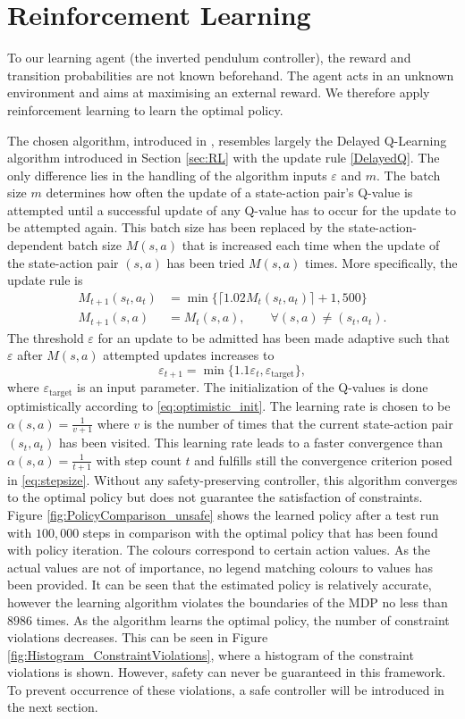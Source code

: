 \documentclass[../main.tex]{subfiles}
\begin{document}
\section{Reinforcement Learning}
To our learning agent (the inverted pendulum controller), the reward and transition probabilities are not known beforehand. The agent acts in an unknown environment and aims at maximising an external reward. We therefore apply reinforcement learning to learn the optimal policy. 

The chosen algorithm, introduced in \cite{talebi2017modified}, resembles largely the Delayed Q-Learning algorithm introduced in Section \ref{sec:RL} with the update rule \eqref{DelayedQ}. The only difference lies in the handling of the algorithm inputs $\varepsilon$ and $m$. The batch size $m$ determines how often the update of a state-action pair's Q-value is attempted until a successful update of any Q-value has to occur for the update to be attempted again. This batch size has been replaced by the state-action-dependent batch size $M(s,a)$ that is increased each time when the update of the state-action pair $(s,a)$ has been tried $M(s,a)$ times. More specifically, the update rule is 
\begin{align}
    M_{t+1}(s_t,a_t) &= \min\{\lceil1.02M_t(s_t,a_t)\rceil+1, 500\}\\
    M_{t+1}(s,a) &= M_t(s,a), \qquad \forall (s,a) \neq (s_t,a_t).
\end{align}
The threshold $\varepsilon$ for an update to be admitted has been made adaptive such that $\varepsilon$ after $M(s,a)$ attempted updates increases to 
\begin{equation}
    \varepsilon_{t+1} = \min\{1.1 \varepsilon_t, \varepsilon_{\text{target}}\}, 
\end{equation}
where $\varepsilon_{\text{target}}$ is an input parameter.
The initialization of the Q-values is done optimistically according to \eqref{eq:optimistic_init}. The learning rate is chosen to be $\alpha(s,a) = \frac{1}{v+1}$ where $v$ is the number of times that the current state-action pair $(s_t,a_t)$ has been visited. This learning rate leads to a faster convergence than $\alpha(s,a) = \frac{1}{t+1}$ with step count $t$ and fulfills still the convergence criterion posed in \eqref{eq:stepsize}. Without any safety-preserving controller, this algorithm converges to the optimal policy but does not guarantee the satisfaction of constraints. Figure \ref{fig:PolicyComparison_unsafe} shows the learned policy after a test run with $100,000$ steps in comparison with the optimal policy that has been found with policy iteration. The colours correspond to certain action values. As the actual values are not of importance, no legend matching colours to values has been provided. It can be seen that the estimated policy is relatively accurate, however the learning algorithm violates the boundaries of the MDP no less than $8986$ times. As the algorithm learns the optimal policy, the number of constraint violations decreases. This can be seen in Figure \ref{fig:Histogram_ConstraintViolations}, where a histogram of the constraint violations is shown. However, safety can never be guaranteed in this framework. To prevent occurrence of these violations, a safe controller will be introduced in the next section.
\end{document}
